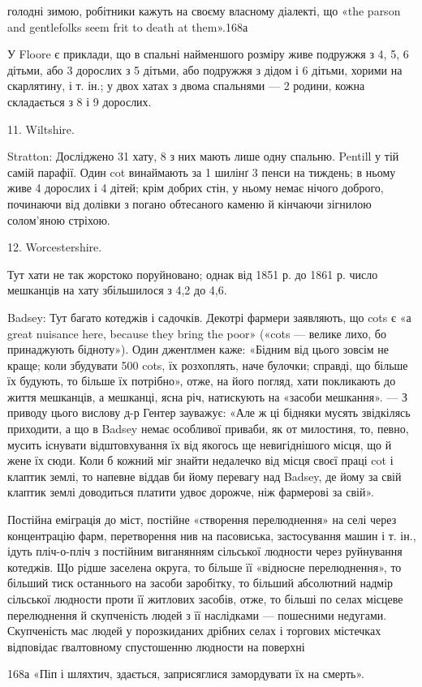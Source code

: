 голодні зимою, робітники кажуть на своєму власному діалекті,
що «the parson and gentlefolks seem frit to death at them».168а

У Floore є приклади, що в спальні найменшого розміру живе
подружжя з 4, 5, 6 дітьми, або 3 дорослих з 5 дітьми, або подружжя
з дідом і 6 дітьми, хорими на скарлятину, і т. ін.; у двох
хатах з двома спальнями — 2 родини, кожна складається з 8
і 9 дорослих.

11. Wiltshire.

Stratton: Досліджено 31 хату, 8 з них мають лише одну
спальню. Pentill у тій самій парафії. Один cot винаймають за
1 шилінґ 3 пенси на тиждень; в ньому живе 4 дорослих і 4 дітей;
крім добрих стін, у ньому немає нічого доброго, починаючи від
долівки з погано обтесаного каменю й кінчаючи зігнилою солом’яною
стріхою.

12. Worcestershire.

Тут хати не так жорстоко поруйновано; однак від 1851 р. до
1861 р. число мешканців на хату збільшилося з 4,2 до 4,6.

Badsey: Тут багато котеджів і садочків. Декотрі фармери
заявляють, що cots є «а great nuisance here, because they bring
the poor» («cots — велике лихо, бо принаджують бідноту»).
Один джентлмен каже: «Бідним від цього зовсім не краще; коли
збудувати 500 cots, їх розхоплять, наче булочки; справді, що
більше їх будують, то більше їх потрібно», отже, на його погляд,
хати покликають до життя мешканців, а мешканці, ясна річ,
натискують на «засоби мешкання». — З приводу цього вислову
д-р Гентер зауважує: «Але ж ці бідняки мусять звідкілясь
приходити, а що в Badsey немає особливої приваби, як от милостиня,
то, певно, мусить існувати відштовхування їх від якогось
ще невигіднішого місця, що й жене їх сюди. Коли б кожний міг
знайти недалечко від місця своєї праці cot і клаптик землі, то
напевне віддав би йому перевагу над Badsey, де йому за свій
клаптик землі доводиться платити удвоє дорожче, ніж фармерові
за свій».

Постійна еміграція до міст, постійне «створення перелюднення»
на селі через концентрацію фарм, перетворення нив на пасовиська,
застосування машин і т. ін., ідуть пліч-о-пліч з постійним
виганянням сільської людности через руйнування котеджів.
Що рідше заселена округа, то більше її «відносне перелюднення»,
то більший тиск останнього на засоби заробітку, то більший
абсолютний надмір сільської людности проти її житлових
засобів, отже, то більші по селах місцеве перелюднення й скупченість
людей з її наслідками — пошесними недугами. Скупченість
мас людей у порозкиданих дрібних селах і торгових містечках
відповідає ґвалтовному спустошенню людности на поверхні

168а «Піп і шляхтич, здається, заприсяглися замордувати їх на
смерть».
